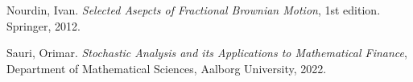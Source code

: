 \documentclass[11pt,a4paper,twoside,openright,english]{book}
\begin{document}
\frontmatter





\mainmatter

%








% 
% 

%

\backmatter


%
%
\begin{thebibliography}{}
Nourdin, Ivan. \textit{Selected Asepcts of Fractional Brownian Motion}, 1st edition. Springer, 2012.

Sauri, Orimar. \textit{Stochastic Analysis and its Applications to Mathematical Finance}, Department of Mathematical Sciences, Aalborg University, 2022.
\end{thebibliography}{}
\end{document}
